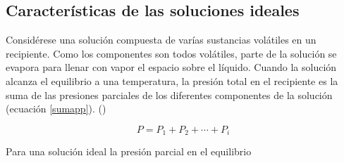 \documentclass[11pt,letterpaper]{article}
\newcommand{\cita}[1]{(\cite{#1})}
\begin{document}
	\subsection{Características de las soluciones ideales}
	
	Considérese una solución compuesta de varías sustancias volátiles en un recipiente. Como los componentes son todos volátiles, parte de la solución se evapora para llenar con vapor el espacio sobre el líquido. Cuando la solución alcanza el equilibrio a una temperatura, la presión total en el recipiente es la suma de las presiones parciales de los diferentes componentes de la solución (ecuación \ref{sumapp}). \cita{castellan}
	
	\begin{equation}
		P = P_1 + P_2 + \cdots + P_i \label{sumapp}
	\end{equation}
	
	Para una solución ideal la presión parcial en el equilibrio 
	
	\begin{Ley}[De Raoult]

	\end{Ley}

	
	
	
	\printbibliography[title={Referencias}]
	
\end{document}
